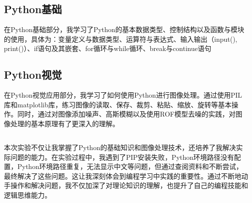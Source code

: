 \documentclass[12pt,a4paper,UTF8]{article}
\begin{document}
    \subsection{Python基础}
    在Python基础部分，我学习了Python的基本数据类型、控制结构以及函数与模块的使用，具体为：变量定义与数据类型、运算符与表达式、输入输出（input(), print()）、if语句及其嵌套、for循环与while循环、break与continue语句

    \subsection{Python视觉}
    在Python视觉应用部分，我学习了如何使用Python进行图像处理。通过使用PIL库和matplotlib库，练习图像的读取、保存、裁剪、粘贴、缩放、旋转等基本操作。同时，通过对图像添加噪声、高斯模糊以及使用ROF模型去噪的实践，对图像处理的基本原理有了更深入的理解。

    \subsection{}
    本次实验不仅让我掌握了Python的基础知识和图像处理技术，还培养了我解决实际问题的能力。在实验过程中，我遇到了PIP安装失败，Python环境路径没有配置，Python环境路径重复，无法显示中文等问题，但通过查阅资料和不断尝试，最终解决了这些问题。这让我深刻体会到编程学习中实践的重要性。通过不断地动手操作和解决问题，我不仅加深了对理论知识的理解，也提升了自己的编程技能和逻辑思维能力。
    
\end{document}

